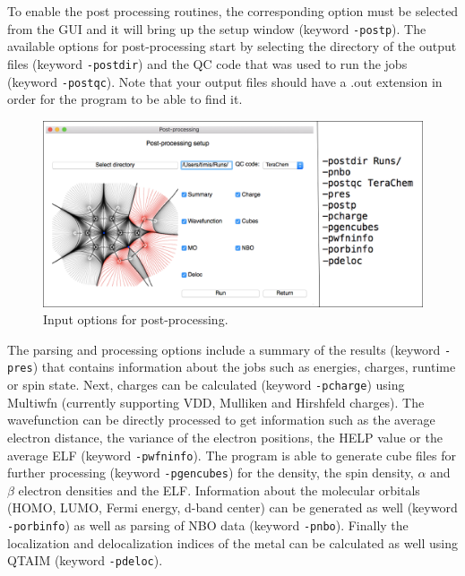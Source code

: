 \documentclass[a4paper,12pt]{assignment}
\begin{document}
To enable the post processing routines, the corresponding option must be selected from the GUI and it will bring up the setup window (keyword \texttt{-postp}). The available options for post-processing start by selecting the directory of the output files (keyword \texttt{-postdir}) and the QC code that was used to run the jobs (keyword \texttt{-postqc}). Note that your output files should have a .out extension in order for the program to be able to find it. 

\begin{figure}[htb!]
\centering
\includegraphics[width=\textwidth]{./Figures/fig15.png}
\caption{Input options for post-processing.}
\label{post0}
\end{figure}

The parsing and processing options include a summary of the results (keyword \texttt{-pres}) that contains information about the jobs such as energies, charges, runtime or spin state. Next, charges can be calculated (keyword \texttt{-pcharge}) using Multiwfn (currently supporting VDD, Mulliken and Hirshfeld charges). The wavefunction can be directly processed to get information such as the average electron distance, the variance of the electron positions, the HELP value or the average ELF (keyword \texttt{-pwfninfo}). The program is able to generate cube files for further processing (keyword \texttt{-pgencubes}) for the density, the spin density, $\alpha$ and $\beta$ electron densities and the ELF. Information about the molecular orbitals (HOMO, LUMO, Fermi energy, d-band center) can be generated as well (keyword \texttt{-porbinfo}) as well as parsing of NBO data (keyword \texttt{-pnbo}). Finally the localization and delocalization indices of the metal can be calculated as well using QTAIM (keyword \texttt{-pdeloc}).
\end{document}
